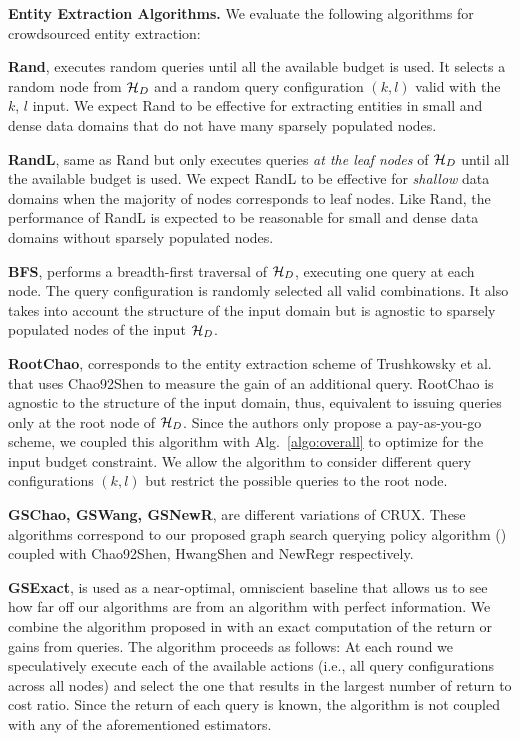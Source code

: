 \noindent\textbf{Entity Extraction Algorithms.} We evaluate the following algorithms for crowdsourced entity extraction:
\squishlist
\item {\bf Rand}, executes random queries until all the available budget is used. It selects a random node from $\mathcal{H}_D$ and a random query configuration $(k,l)$ valid with the $k$, $l$ input. \iftr We expect Rand to be effective for extracting entities in small and dense data domains that do not have many sparsely populated nodes. \fi
\item {\bf RandL}, same as Rand but only executes queries {\em at the leaf nodes} of $\mathcal{H}_D$ until all the available budget is used.  \iftr We expect RandL to be effective for {\em shallow} data domains when the majority of nodes corresponds to leaf nodes. Like Rand, the performance of RandL is expected to be reasonable for small and dense data domains without sparsely populated nodes.\fi
\item {\bf BFS}, performs a breadth-first traversal of $\mathcal{H}_D$, executing one query at each node. The query configuration is randomly selected all valid combinations. \iftr It also takes into account the structure of the input domain but is agnostic to sparsely populated nodes of the input $\mathcal{H}_D$. \fi
\item {\bf RootChao}, corresponds to the entity extraction scheme of Trushkowsky et al.~\cite{trushkowsky:2013} that uses Chao92Shen to measure the gain of an additional query. RootChao is agnostic to the structure of the input domain, thus, equivalent to issuing queries only at the root node of $\mathcal{H}_D$. Since the authors only propose a pay-as-you-go scheme, we coupled this algorithm with Alg.~\ref{algo:overall} to optimize for the input budget constraint. We allow the algorithm to consider different query configurations $(k,l)$ but restrict the possible queries to the root node.
\item {\bf GSChao, GSWang, GSNewR}, are different variations of CRUX. These algorithms correspond to our proposed graph search querying policy algorithm () coupled with Chao92Shen, HwangShen and NewRegr respectively.
\item {\bf GSExact}, is used as a near-optimal, omniscient baseline that allows us to see how far off our algorithms are from an algorithm with perfect information. We combine the algorithm proposed in  with an exact computation of the return or gains from queries. The algorithm proceeds as follows: At each round we speculatively execute each of the available actions (i.e., all query configurations across all nodes) and select the one that results in the largest number of return to cost ratio. Since the return of each query is known, the algorithm is not coupled with any of the aforementioned estimators.
\squishend

